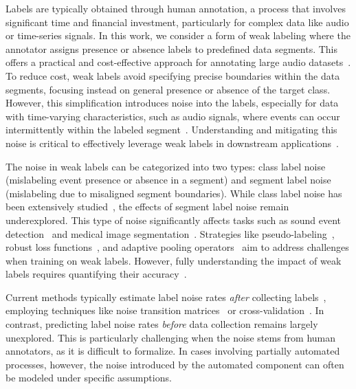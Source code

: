 Labels are typically obtained through human annotation, a process that involves significant time and financial investment, particularly for complex data like audio or time-series signals. In this work, we consider a form of weak labeling where the annotator assigns presence or absence labels to predefined data segments. This offers a practical and cost-effective approach for annotating large audio datasets~\citep{Martin-Morato2023a}. To reduce cost, weak labels avoid specifying precise boundaries within the data segments, focusing instead on general presence or absence of the target class. However, this simplification introduces noise into the labels, especially for data with time-varying characteristics, such as audio signals, where events can occur intermittently within the labeled segment~\citep{Turpault2021}. Understanding and mitigating this noise is critical to effectively leverage weak labels in downstream applications~\citep{Kumar2016}.

The noise in weak labels can be categorized into two types: class label noise (mislabeling event presence or absence in a segment) and segment label noise (mislabeling due to misaligned segment boundaries). While class label noise has been extensively studied~\citep{Song2022, Zhang2021}, the effects of segment label noise remain underexplored. This type of noise significantly affects tasks such as sound event detection~\citep{Hershey2021, Turpault2021, Shah2018} and medical image segmentation~\citep{Yao2023}. Strategies like pseudo-labeling~\citep{Dinkel2022}, robust loss functions~\citep{Fonseca2019_agnostic}, and adaptive pooling operators~\citep{McFee2018} aim to address challenges when training on weak labels. However, fully understanding the impact of weak labels requires quantifying their accuracy~\citep{Shah2018, Turpault2021}.

Current methods typically estimate label noise rates \textit{after} collecting labels~\citep{Song2022}, employing techniques like noise transition matrices~\citep{Li2021} or cross-validation~\citep{Chen2019}. In contrast, predicting label noise rates \textit{before} data collection remains largely unexplored. This is particularly challenging when the noise stems from human annotators, as it is difficult to formalize. In cases involving partially automated processes, however, the noise introduced by the automated component can often be modeled under specific assumptions.

